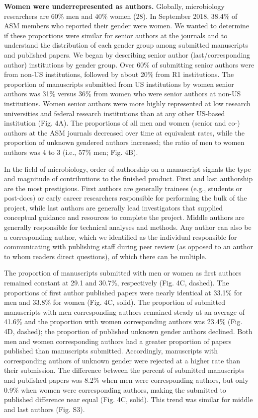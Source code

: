 \documentclass[11pt,]{article}
\begin{document}
\textbf{Women were underrepresented as authors.} Globally, microbiology
researchers are 60\% men and 40\% women (28). In September 2018, 38.4\%
of ASM members who reported their gender were women. We wanted to
determine if these proportions were similar for senior authors at the
journals and to understand the distribution of each gender group among
submitted manuscripts and published papers. We began by describing
senior author (last/corresponding author) institutions by gender group.
Over 60\% of submitting senior authors were from non-US institutions,
followed by about 20\% from R1 institutions. The proportion of
manuscripts submitted from US institutions by women senior authors was
31\% versus 36\% from women who were senior authors at non-US
institutions. Women senior authors were more highly represented at low
research universities and federal research institutions than at any
other US-based institution (Fig. 4A). The proportions of all men and
women (senior and co-) authors at the ASM journals decreased over time
at equivalent rates, while the proportion of unknown gendered authors
increased; the ratio of men to women authors was 4 to 3 (i.e., 57\% men;
Fig. 4B).

In the field of microbiology, order of authorship on a manuscript
signals the type and magnitude of contributions to the finished product.
First and last authorship are the most prestigious. First authors are
generally trainees (e.g., students or post-docs) or early career
researchers responsible for performing the bulk of the project, while
last authors are generally lead investigators that supplied conceptual
guidance and resources to complete the project. Middle authors are
generally responsible for technical analyses and methods. Any author can
also be a corresponding author, which we identified as the individual
responsible for communicating with publishing staff during peer review
(as opposed to an author to whom readers direct questions), of which
there can be multiple.

The proportion of manuscripts submitted with men or women as first
authors remained constant at 29.1 and 30.7\%, respectively (Fig. 4C,
dashed). The proportions of first author published papers were nearly
identical at 33.1\% for men and 33.8\% for women (Fig. 4C, solid). The
proportion of submitted manuscripts with men corresponding authors
remained steady at an average of 41.6\% and the proportion with women
corresponding authors was 23.4\% (Fig. 4D, dashed); the proportion of
published unknown gender authors declined. Both men and women
corresponding authors had a greater proportion of papers published than
manuscripts submitted. Accordingly, manuscripts with corresponding
authors of unknown gender were rejected at a higher rate than their
submission. The difference between the percent of submitted manuscripts
and published papers was 8.2\% when men were corresponding authors, but
only 0.9\% when women were corresponding authors, making the submitted
to published difference near equal (Fig. 4C, solid). This trend was
similar for middle and last authors (Fig. S3).
\end{document}
